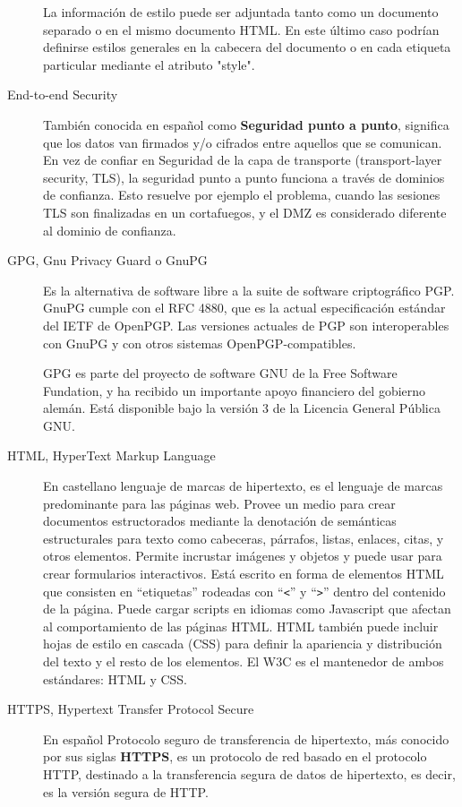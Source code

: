 \begin{description}
La información de estilo puede ser adjuntada tanto como un documento separado o en el mismo documento HTML. En este último caso podrían definirse estilos generales en la cabecera del documento o en cada etiqueta particular mediante el atributo "style".

\item[End-to-end Security]
También conocida en español como \textbf{Seguridad punto a punto}, significa que los datos van firmados y/o cifrados entre aquellos que se comunican. En vez de confiar en Seguridad de la capa de transporte (transport-layer security, TLS), la seguridad punto a punto funciona a través de dominios de confianza. Esto resuelve por ejemplo el problema, cuando las sesiones TLS son finalizadas en un cortafuegos, y el DMZ es considerado diferente al dominio de confianza.

\item[GPG, Gnu Privacy Guard o GnuPG]
Es la alternativa de software libre a la suite de software criptográfico PGP. GnuPG cumple con el RFC 4880, que es la actual especificación estándar del IETF de OpenPGP. Las versiones actuales de PGP son interoperables con GnuPG y con otros sistemas OpenPGP-compatibles.

GPG es parte del proyecto de software GNU de la Free Software Fundation, y ha recibido un importante apoyo financiero del gobierno alemán. Está disponible bajo la versión 3 de la Licencia General Pública GNU.

\item[HTML, HyperText Markup Language]
En castellano lenguaje de marcas de hipertexto, es el lenguaje de marcas predominante para las páginas web. Provee un medio para crear documentos estructorados mediante la denotación de semánticas estructurales para texto como cabeceras, párrafos, listas, enlaces, citas, y otros elementos. Permite incrustar imágenes y objetos y puede usar para crear formularios interactivos. Está escrito en forma de elementos HTML que consisten en ``etiquetas'' rodeadas con ``\verb|<|'' y ``\verb|>|'' dentro del contenido de la página. Puede cargar scripts en idiomas como Javascript que afectan al comportamiento de las páginas HTML. HTML también puede incluir hojas de estilo en cascada (CSS) para definir la apariencia y distribución del texto y el resto de los elementos. El W3C es el mantenedor de ambos estándares: HTML y CSS.

\item[HTTPS, Hypertext Transfer Protocol Secure]
En español Protocolo seguro de transferencia de hipertexto, más conocido por sus siglas \textbf{HTTPS}, es un protocolo de red basado en el protocolo HTTP, destinado a la transferencia segura de datos de hipertexto, es decir, es la versión segura de HTTP.


\end{description}
